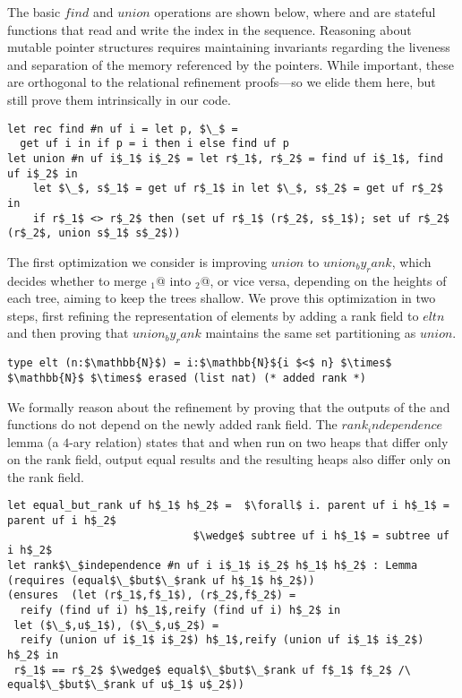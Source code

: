 \documentclass[sigplan,screen]{acmart}\settopmatter{}
\begin{document}
\fi

The basic \ls$find$ and \ls$union$ operations are shown below,
where  and  are stateful functions that read and
write the  index in the  sequence.
%
Reasoning about mutable pointer structures requires maintaining
invariants regarding the liveness and separation of the memory
referenced by the pointers. While important, these are orthogonal to
the relational refinement proofs---so we elide them here,
but still prove them intrinsically in our code.

\begin{lstlisting}
let rec find #n uf i = let p, $\_$ = 
  get uf i in if p = i then i else find uf p 
let union #n uf i$_1$ i$_2$ = let r$_1$, r$_2$ = find uf i$_1$, find uf i$_2$ in 
    let $\_$, s$_1$ = get uf r$_1$ in let $\_$, s$_2$ = get uf r$_2$ in
    if r$_1$ <> r$_2$ then (set uf r$_1$ (r$_2$, s$_1$); set uf r$_2$ (r$_2$, union s$_1$ s$_2$)) 
\end{lstlisting}

 The first optimization we consider
is \iffull improving \ls$union$ to \fi \ls$union_by_rank$, which decides whether
to merge \ls@r$_1$@ into \ls@r$_2$@, or vice versa, depending on the
heights of each tree, aiming to keep the trees shallow.
%
We prove this optimization in two steps, first refining the
representation of elements by adding a rank field to \ls$elt n$ and then
proving that \ls$union_by_rank$ maintains the same set partitioning
as \ls$union$.

\begin{lstlisting}
type elt (n:$\mathbb{N}$) = i:$\mathbb{N}${i $<$ n} $\times$ $\mathbb{N}$ $\times$ erased (list nat) (* added rank *)
\end{lstlisting}

We formally reason about the refinement by proving that the outputs of
the  and  functions do not depend on the newly
added rank field.
%
The \ls$rank_independence$ lemma (a $4$-ary relation) states
that  and  when run on two heaps that differ only
on the rank field, output equal results and the resulting heaps also
differ only on the rank field.
%
\begin{lstlisting}
let equal_but_rank uf h$_1$ h$_2$ =  $\forall$ i. parent uf i h$_1$ = parent uf i h$_2$
                             $\wedge$ subtree uf i h$_1$ = subtree uf i h$_2$
let rank$\_$independence #n uf i i$_1$ i$_2$ h$_1$ h$_2$ : Lemma
(requires (equal$\_$but$\_$rank uf h$_1$ h$_2$))
(ensures  (let (r$_1$,f$_1$), (r$_2$,f$_2$) = 
  reify (find uf i) h$_1$,reify (find uf i) h$_2$ in
 let ($\_$,u$_1$), ($\_$,u$_2$) = 
  reify (union uf i$_1$ i$_2$) h$_1$,reify (union uf i$_1$ i$_2$) h$_2$ in
 r$_1$ == r$_2$ $\wedge$ equal$\_$but$\_$rank uf f$_1$ f$_2$ /\ equal$\_$but$\_$rank uf u$_1$ u$_2$))
\end{lstlisting}
\end{document}
